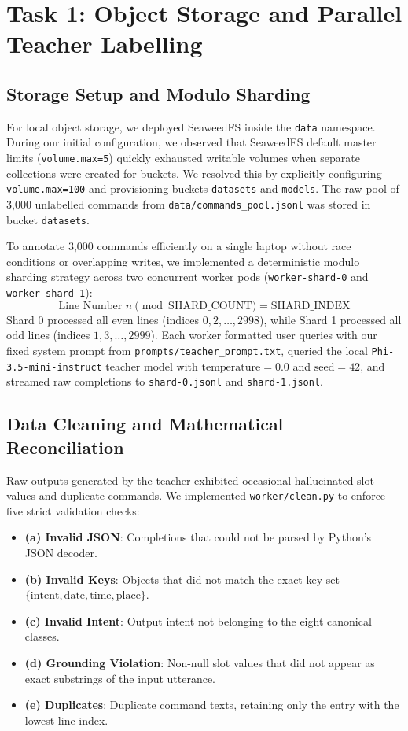 \documentclass[10pt,a4paper]{article}
\begin{document}
\section{Task 1: Object Storage and Parallel Teacher Labelling}
\subsection{Storage Setup and Modulo Sharding}
For local object storage, we deployed SeaweedFS inside the \texttt{data} namespace. During our initial configuration, we observed that SeaweedFS default master limits (\texttt{volume.max=5}) quickly exhausted writable volumes when separate collections were created for buckets. We resolved this by explicitly configuring \texttt{-volume.max=100} and provisioning buckets \texttt{datasets} and \texttt{models}. The raw pool of 3,000 unlabelled commands from \texttt{data/commands\_pool.jsonl} was stored in bucket \texttt{datasets}.

To annotate 3,000 commands efficiently on a single laptop without race conditions or overlapping writes, we implemented a deterministic modulo sharding strategy across two concurrent worker pods (\texttt{worker-shard-0} and \texttt{worker-shard-1}):
$$\text{Line Number } n \pmod{\text{SHARD\_COUNT}} = \text{SHARD\_INDEX}$$
Shard 0 processed all even lines (indices $0, 2, \dots, 2998$), while Shard 1 processed all odd lines (indices $1, 3, \dots, 2999$). Each worker formatted user queries with our fixed system prompt from \texttt{prompts/teacher\_prompt.txt}, queried the local \texttt{Phi-3.5-mini-instruct} teacher model with $\text{temperature}=0.0$ and $\text{seed}=42$, and streamed raw completions to \texttt{shard-0.jsonl} and \texttt{shard-1.jsonl}.

\subsection{Data Cleaning and Mathematical Reconciliation}
Raw outputs generated by the teacher exhibited occasional hallucinated slot values and duplicate commands. We implemented \texttt{worker/clean.py} to enforce five strict validation checks:
\begin{itemize}
    \item \textbf{(a) Invalid JSON}: Completions that could not be parsed by Python's JSON decoder.
    \item \textbf{(b) Invalid Keys}: Objects that did not match the exact key set $\{\text{intent}, \text{date}, \text{time}, \text{place}\}$.
    \item \textbf{(c) Invalid Intent}: Output intent not belonging to the eight canonical classes.
    \item \textbf{(d) Grounding Violation}: Non-null slot values that did not appear as exact substrings of the input utterance.
    \item \textbf{(e) Duplicates}: Duplicate command texts, retaining only the entry with the lowest line index.
\end{itemize}
\end{document}
